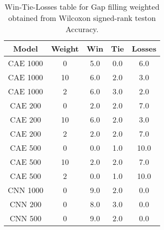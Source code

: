 \begin{table}[H]
\centering
\begin{tabular}{|c|c|c|c|c|}

\textbf{Model} & \textbf{Weight} &  \textbf{Win} &  \textbf{Tie} &  \textbf{Losses} \\
\hline

      CAE 1000 &               0 &           5.0 &           0.0 &              6.0 \\
\hline
      CAE 1000 &              10 &           6.0 &           2.0 &              3.0 \\
\hline
      CAE 1000 &               2 &           6.0 &           3.0 &              2.0 \\
\hline
       CAE 200 &               0 &           2.0 &           2.0 &              7.0 \\
\hline
       CAE 200 &              10 &           6.0 &           2.0 &              3.0 \\
\hline
       CAE 200 &               2 &           2.0 &           2.0 &              7.0 \\
\hline
       CAE 500 &               0 &           0.0 &           1.0 &             10.0 \\
\hline
       CAE 500 &              10 &           2.0 &           2.0 &              7.0 \\
\hline
       CAE 500 &               2 &           0.0 &           1.0 &             10.0 \\
\hline
      CNN 1000 &               0 &           9.0 &           2.0 &              0.0 \\
\hline
       CNN 200 &               0 &           8.0 &           3.0 &              0.0 \\
\hline
       CNN 500 &               0 &           9.0 &           2.0 &              0.0 \\
\hline

\end{tabular}
\caption{Win-Tie-Losses table for Gap filling weighted obtained from Wilcoxon signed-rank teston Accuracy.}
\label{tab:gap_filling_weighted_weighted_comparison_all}
\end{table}
